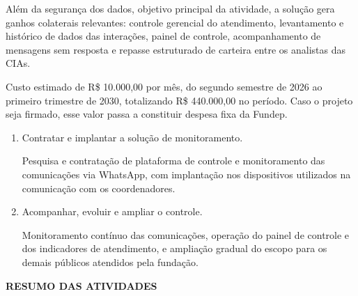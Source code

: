 \documentclass[12pt,a4paper]{article}
\newcommand{\secao}[1]{%
  \par\vspace{6pt}%
  {\noindent\bfseries\color{azulTitulo}\fontsize{13}{16}\selectfont #1}%
  \par\vspace{2pt}%
}
\begin{document}
Além da segurança dos dados, objetivo principal da atividade, a solução gera ganhos colaterais relevantes: controle gerencial do atendimento, levantamento e histórico de dados das interações, painel de controle, acompanhamento de mensagens sem resposta e repasse estruturado de carteira entre os analistas das CIAs.

Custo estimado de R\$ 10.000,00 por mês, do segundo semestre de 2026 ao primeiro trimestre de 2030, totalizando R\$ 440.000,00 no período. Caso o projeto seja firmado, esse valor passa a constituir despesa fixa da Fundep.

\begin{enumerate}
  \item Contratar e implantar a solução de monitoramento.

        Pesquisa e contratação de plataforma de controle e monitoramento das comunicações via WhatsApp, com implantação nos dispositivos utilizados na comunicação com os coordenadores.
  \item Acompanhar, evoluir e ampliar o controle.

        Monitoramento contínuo das comunicações, operação do painel de controle e dos indicadores de atendimento, e ampliação gradual do escopo para os demais públicos atendidos pela fundação.
\end{enumerate}

\secao{RESUMO DAS ATIVIDADES}
\end{document}
